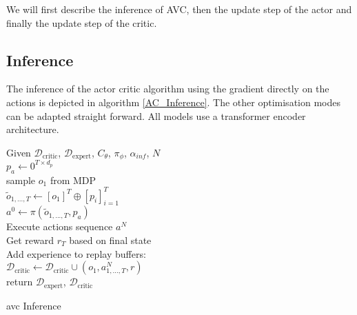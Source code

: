 We will first describe the inference of AVC, then the update step of the actor and finally the update step of the critic.

\subsection{Inference}
The inference of the actor critic algorithm using the gradient directly on the actions is depicted in algorithm \ref{AC_Inference}. 
The other optimisation modes can be adapted straight forward. All models use a transformer encoder architecture. \\


\begin{algorithm}[H]
    \Require Given $\mathcal{D}_{\text{critic}}$, $\mathcal{D}_{\text{expert}}$,  
    $C_{\theta}$, $\pi_{\phi}$, $\alpha_{inf}$, $N$\\
    \State $p_a \gets 0^{T \times d_p}$ \hfill{} \\
    \State sample $o_1$ from MDP\\
    \State $\tilde{o}_{1, ..., T} \gets [o_1]^T \oplus [p_i]_{i=1}^T$ \hfill{} \\
    \State $a^0 \gets \pi(\tilde{o}_{1, ..., T}, p_a)$\hfill{} \\
    \State Execute actions sequence $a^N$\\
    \State Get reward $r_T$ based on final state\\
    \State Add experience to replay buffers:\\
    \State $\mathcal{D}_{\text{critic}} \gets \mathcal{D}_{\text{critic}} \cup (o_1, a^N_{1, ..., T}, r)$\\
    return $\mathcal{D}_{\text{expert}}$, $\mathcal{D}_{\text{critic}}$
    \caption{\ac{avc} Inference}
    \label{AC_Inference}

\end{algorithm}


